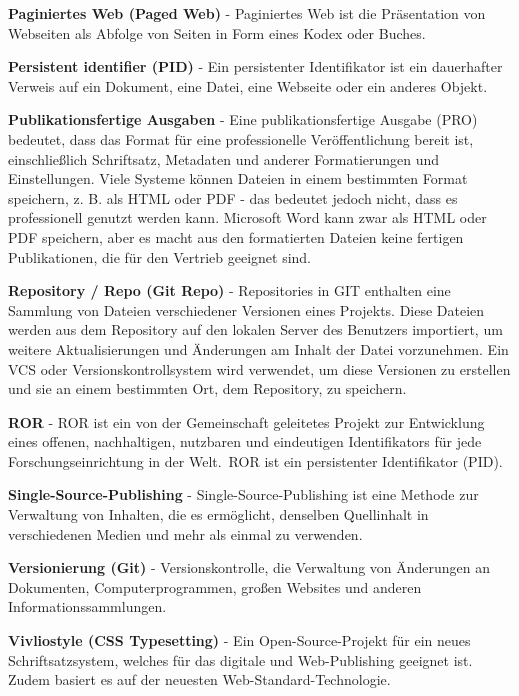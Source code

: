 \documentclass{article}
\begin{document}
\textbf{Paginiertes Web (Paged Web)} - Paginiertes Web ist die Präsentation von Webseiten als Abfolge von Seiten in Form eines Kodex oder Buches.


\textbf{Persistent identifier (PID)} - Ein persistenter Identifikator ist ein dauerhafter Verweis auf ein Dokument, eine Datei, eine Webseite oder ein anderes Objekt.


\textbf{Publikationsfertige Ausgaben} - Eine publikationsfertige Ausgabe (PRO) bedeutet, dass das Format für eine professionelle Veröffentlichung bereit ist, einschließlich Schriftsatz, Metadaten und anderer Formatierungen und Einstellungen. Viele Systeme können Dateien in einem bestimmten Format speichern, z. B. als HTML oder PDF - das bedeutet jedoch nicht, dass es professionell genutzt werden kann. Microsoft Word kann zwar als HTML oder PDF speichern, aber es macht aus den formatierten Dateien keine fertigen Publikationen, die für den Vertrieb geeignet sind.


\textbf{Repository / Repo (Git Repo)} - Repositories in GIT enthalten eine Sammlung von Dateien verschiedener Versionen eines Projekts. Diese Dateien werden aus dem Repository auf den lokalen Server des Benutzers importiert, um weitere Aktualisierungen und Änderungen am Inhalt der Datei vorzunehmen. Ein VCS oder Versionskontrollsystem wird verwendet, um diese Versionen zu erstellen und sie an einem bestimmten Ort, dem Repository, zu speichern.


\textbf{ROR} - ROR ist ein von der Gemeinschaft geleitetes Projekt zur Entwicklung eines offenen, nachhaltigen, nutzbaren und eindeutigen Identifikators für jede Forschungseinrichtung in der Welt. ROR ist ein persistenter Identifikator (PID).


\textbf{Single-Source-Publishing} - Single-Source-Publishing ist eine Methode zur Verwaltung von Inhalten, die es ermöglicht, denselben Quellinhalt in verschiedenen Medien und mehr als einmal zu verwenden.


\textbf{Versionierung (Git)} - Versionskontrolle, die Verwaltung von Änderungen an Dokumenten, Computerprogrammen, großen Websites und anderen Informationssammlungen.


\textbf{Vivliostyle (CSS Typesetting)} - Ein Open-Source-Projekt für ein neues Schriftsatzsystem, welches für das digitale und Web-Publishing geeignet ist. Zudem basiert es auf der neuesten Web-Standard-Technologie.
\end{document}
